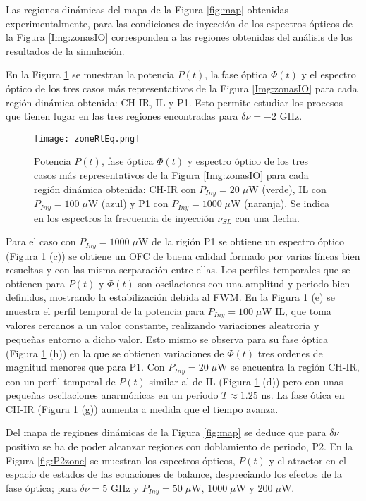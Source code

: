 		Las regiones din\'amicas del mapa de la Figura \ref{fig:map} obtenidas experimentalmente, para las condiciones de inyecci\'on de los espectros \'opticos de la Figura \ref{Img:zonasIO} corresponden a las regiones obtenidas del an\'alisis de los resultados de la simulaci\'on.

		En la Figura \ref{fig:zoneRtEq} se muestran la potencia $P(t)$, la fase \'optica $\Phi (t)$ y el espectro \'optico de los tres casos m\'as representativos de la Figura \ref{Img:zonasIO} para cada regi\'on din\'amica obtenida: CH-IR, IL y P1. Esto permite estudiar los procesos que tienen lugar en las tres regiones encontradas para $\delta\nu = -2$ GHz. 

			\begin{figure}[H]
				\centering
				\texttt{[image: zoneRtEq.png]}
				\caption{\label{fig:zoneRtEq}Potencia $P(t)$, fase \'optica $\Phi (t)$ y espectro \'optico de los tres casos m\'as representativos de la Figura \ref{Img:zonasIO} para cada regi\'on din\'amica obtenida: CH-IR con $P_{Iny} = 20\;\mu$W (verde), IL con $P_{Iny} = 100\;\mu$W (azul) y P1 con $P_{Iny} = 1000\;\mu$W (naranja). Se indica en los espectros la frecuencia de inyecci\'on $\nu_{SL}$ con una flecha.}	
			\end{figure}

		Para el caso con $P_{Iny} = 1000\;\mu$W de la rigi\'on P1 se obtiene un espectro \'optico (Figura \ref{fig:zoneRtEq} (c)) se obtiene un OFC de buena calidad formado por varias l\'ineas bien resueltas y con las misma serparaci\'on entre ellas. Los perfiles temporales que se obtienen para $P(t)$ y $\Phi(t)$ son oscilaciones con una amplitud y periodo bien definidos, mostrando la estabilizaci\'on debida al FWM. En la Figura \ref{fig:zoneRtEq} (e)  se muestra el perfil temporal de la potencia para $P_{Iny} = 100\;\mu$W IL, que toma valores cercanos a un valor constante, realizando variaciones aleatroria y pequeñas entorno a dicho valor. Esto mismo se observa para su fase \'optica (Figura \ref{fig:zoneRtEq} (h)) en la que se obtienen variaciones de $\Phi(t)$ tres ordenes de magnitud menores que para P1. Con $P_{Iny} = 20\;\mu$W se encuentra la regi\'on CH-IR, con un perfil temporal de $P(t)$ similar al de IL (Figura \ref{fig:zoneRtEq} (d)) pero con unas pequeñas oscilaciones anarm\'onicas en un periodo $T \approx 1.25$ ns. La fase \'otica en CH-IR (Figura \ref{fig:zoneRtEq} (g)) aumenta a medida que el tiempo avanza.

		Del mapa de regiones din\'amicas de la Figura \ref{fig:map} se deduce que para $\delta\nu$ positivo se ha de poder alcanzar regiones con doblamiento de periodo, P2. En la Figura \ref{fig:P2zone} se muestran los espectros \'opticos, $P(t)$ y el atractor en el espacio de estados de las ecuaciones de balance, despreciando los efectos de la fase \'optica; para $\delta\nu = 5$ GHz y $P_{Iny} = 50\;\mu \textrm{W, } 1000\;\mu\textrm{W y } 200\;\mu$W.

